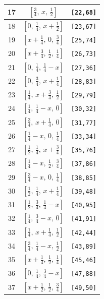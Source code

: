 \documentclass[fleqn,8pt]{jsarticle}
\begin{document}
\begin{longtable}{ccc}
17 & $\left[ \frac{3}{4},\, x,\, \frac{1}{2} \right]$ & {\tt [22,68]} \\ \hline
18 & $\left[ 0,\, \frac{1}{4},\, x + \frac{1}{2} \right]$ & {\tt [23,67]} \\ \hline
19 & $\left[ x + \frac{1}{4},\, 0,\, \frac{3}{4} \right]$ & {\tt [25,74]} \\ \hline
20 & $\left[ x + \frac{3}{4},\, \frac{1}{2},\, \frac{1}{4} \right]$ & {\tt [26,73]} \\ \hline
21 & $\left[ 0,\, \frac{1}{4},\, \frac{1}{4} - x \right]$ & {\tt [27,36]} \\ \hline
22 & $\left[ 0,\, \frac{3}{4},\, x + \frac{1}{4} \right]$ & {\tt [28,83]} \\ \hline
23 & $\left[ \frac{1}{4},\, x + \frac{3}{4},\, \frac{1}{2} \right]$ & {\tt [29,79]} \\ \hline
24 & $\left[ \frac{1}{4},\, \frac{1}{4} - x,\, 0 \right]$ & {\tt [30,32]} \\ \hline
25 & $\left[ \frac{3}{4},\, x + \frac{1}{4},\, 0 \right]$ & {\tt [31,77]} \\ \hline
26 & $\left[ \frac{1}{4} - x,\, 0,\, \frac{1}{4} \right]$ & {\tt [33,34]} \\ \hline
27 & $\left[ \frac{1}{2},\, \frac{1}{4},\, x + \frac{3}{4} \right]$ & {\tt [35,76]} \\ \hline
28 & $\left[ \frac{1}{4} - x,\, \frac{1}{2},\, \frac{3}{4} \right]$ & {\tt [37,86]} \\ \hline
29 & $\left[ \frac{3}{4} - x,\, 0,\, \frac{1}{4} \right]$ & {\tt [38,85]} \\ \hline
30 & $\left[ \frac{1}{2},\, \frac{1}{4},\, x + \frac{1}{4} \right]$ & {\tt [39,48]} \\ \hline
31 & $\left[ \frac{1}{2},\, \frac{3}{4},\, \frac{1}{4} - x \right]$ & {\tt [40,95]} \\ \hline
32 & $\left[ \frac{1}{4},\, \frac{3}{4} - x,\, 0 \right]$ & {\tt [41,91]} \\ \hline
33 & $\left[ \frac{1}{4},\, x + \frac{1}{4},\, \frac{1}{2} \right]$ & {\tt [42,44]} \\ \hline
34 & $\left[ \frac{3}{4},\, \frac{1}{4} - x,\, \frac{1}{2} \right]$ & {\tt [43,89]} \\ \hline
35 & $\left[ x + \frac{1}{4},\, \frac{1}{2},\, \frac{1}{4} \right]$ & {\tt [45,46]} \\ \hline
36 & $\left[ 0,\, \frac{1}{4},\, \frac{3}{4} - x \right]$ & {\tt [47,88]} \\ \hline
37 & $\left[ x + \frac{1}{2},\, \frac{1}{2},\, \frac{3}{4} \right]$ & {\tt [49,50]} \\ \hline

\end{longtable}
\end{document}
